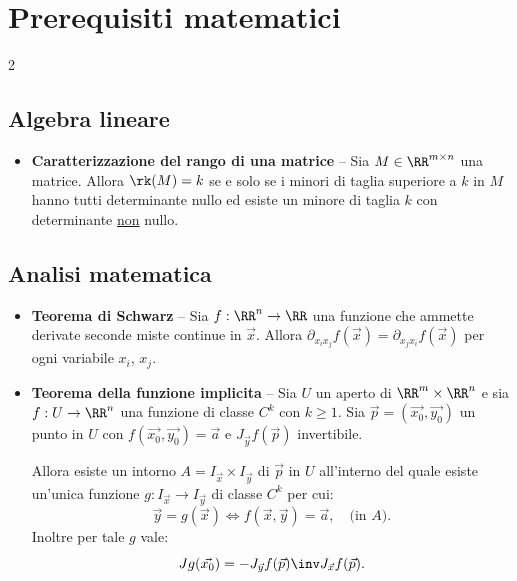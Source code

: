 \chapter*{Prerequisiti matematici}
\setlength{\parindent}{2pt}

\begin{multicols*}{2}
      \section*{Algebra lineare}

      \begin{itemize}
            \item \textbf{Caratterizzazione del rango di una matrice} -- Sia $M \in \RR^{m \times n}$ una matrice. Allora $\rk(M) = k$ se e solo se
                  i minori di taglia superiore a $k$ in $M$ hanno tutti determinante nullo ed esiste un minore di
                  taglia $k$ con determinante \underline{non} nullo.
      \end{itemize}

      \section*{Analisi matematica}

      \begin{itemize}
            \item \textbf{Teorema di Schwarz} -- Sia $f : \RR^n \to \RR$ una funzione che ammette derivate seconde
                  miste continue in $\vec{x}$. Allora $\partial_{x_i x_j} f(\vec{x}) = \partial_{x_j x_i} f(\vec{x})$ per
                  ogni variabile $x_i$, $x_j$.

            \item \textbf{Teorema della funzione implicita} -- Sia $U$ un aperto di $\RR^m \times \RR^n$ e sia
                  $f : U \to \RR^n$ una funzione di classe $C^k$ con $k \geq 1$. Sia $\vec{p} = (\vec{x_0}, \vec{y_0})$ un punto in $U$ con
                  $f(\vec{x_0}, \vec{y_0}) = \vec{a}$ e $J_{\vec{y}} f(\vec{p})$ invertibile. \smallskip

                  Allora esiste un
                  intorno $A = I_{\vec{x}} \times I_{\vec{y}}$  di $\vec{p}$ in $U$ all'interno del quale esiste un'unica
                  funzione $g : I_{\vec{x}} \to I_{\vec{y}}$ di classe $C^k$ per cui:
                  \[ \vec{y} = g(\vec{x}) \iff f(\vec{x}, \vec{y}) = \vec{a}, \quad \text{(in $A$)}. \]
                  Inoltre per tale $g$ vale:
                  \[ J g(\vec{x_0}) = - J_{\vec{y}} f(\vec{p})\inv J_{\vec{x}} f(\vec{p}). \]


\end{itemize}
\end{multicols*}
